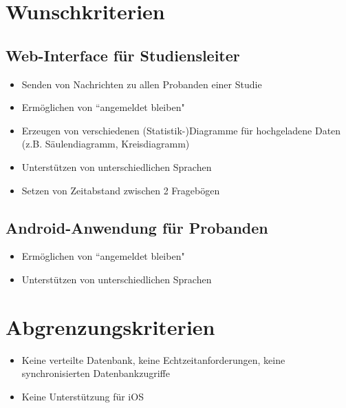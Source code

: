 \documentclass[a4paper]{scrreprt}
\begin{document}
                \vspace*{0.5cm}


        \section{Wunschkriterien}

            \subsection{\gls{Web-Interface} f\"ur \gls{Studiensleiter}}
                \begin{itemize}
                    \item Senden von Nachrichten zu allen \gls{Proband}en einer Studie
                    \item Erm\"oglichen von ``angemeldet bleiben"
                    \item Erzeugen von verschiedenen (Statistik-)Diagramme f\"ur hochgeladene Daten (z.B. S\"aulendiagramm, Kreisdiagramm)
                    \item Unterst\"utzen von unterschiedlichen Sprachen
                    \item Setzen von Zeitabstand zwischen 2 Frageb\"ogen

                \end{itemize}

            \subsection{Android-Anwendung f\"ur \gls{Proband}en}
                \begin{itemize}
                    \item Erm\"oglichen von ``angemeldet bleiben"
                    \item Unterst\"utzen von unterschiedlichen Sprachen
                \end{itemize}
                \vspace*{0.5cm}


        \section{Abgrenzungskriterien}
            \begin{itemize}
                \item Keine verteilte Datenbank, keine Echtzeitanforderungen, keine synchronisierten Datenbankzugriffe
                \item Keine Unterst\"utzung f\"ur iOS
            \end{itemize}
\end{document}
